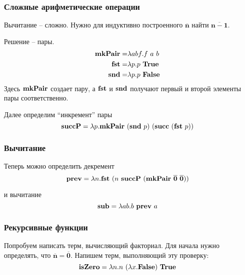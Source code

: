 \documentclass{beamer}
\newcommand{\mmterm}[1]{\text{\textbf{#1}}}
\newcommand{\mmt}{\mmterm{True}}
\newcommand{\mmf}{\mmterm{False}}
\newcommand{\mmchurchn}[1]{\boldsymbol{\overline{#1}}}
\begin{document}
\begin{frame}\frametitle{Сложные арифметические операции}
    
Вычитание -- сложно.
Нужно для индуктивно построенного $\mmchurchn{n}$ найти $\mmchurchn{n-1}$.

Решение -- пары.
\begin{align*}
	\mmterm{mkPair} = &\lambda abf.f\ a\ b\\
	\mmterm{fst} = &\lambda p.p\ \mmterm{True}\\
	\mmterm{snd} = &\lambda p.p\ \mmterm{False}
\end{align*}
Здесь $\mmterm{mkPair}$ создает пару, а $\mmterm{fst}$ и $\mmterm{snd}$ получают первый и второй элементы пары соответственно.

Далее определим ``инкремент'' пары
\[\mmterm{succP} = \lambda p. \mmterm{mkPair}\ (\mmterm{snd}\ p)\ (\mmterm{succ}\ (\mmterm{fst}\ p))\]

\end{frame}

\begin{frame}\frametitle{Вычитание}
    
Теперь можно определить декремент
\[\mmterm{prev} = \lambda n.\mmterm{fst}\ (n\ \mmterm{succP}\ (\mmterm{mkPair}\ \mmchurchn{0}\ \mmchurchn{0}))\]

и вычитание
\[\mmterm{sub} = \lambda ab.b\ \mmterm{prev}\ a\]

\end{frame}

\begin{frame}\frametitle{Рекурсивные функции}
    
Попробуем написать терм, вычисляющий факториал.
Для начала нужно определять, что $\mmchurchn{n} = \mmchurchn{0}$.
Напишем терм, выполняющий эту проверку:
\[\mmterm{isZero} = \lambda n.n\ (\lambda x. \mmf)\ \mmt\]

\end{frame}
\end{document}
